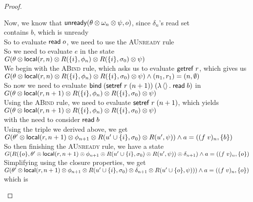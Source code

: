 \begin{proof}
\begin{tabbedproof}
\ooo Now, we know that $\mathsf{unready}({\theta \otimes \omega_n \otimes \psi}, {o})$, since $\delta_n$'s read set \\
\ooo contains $b$, which is unready \\
\ooo So to evaluate $\mathsf{read}\; o$, we need to use the \textsc{AUnready} rule \\
\ooo So we need to evaluate $e$ in the state \\
\ooo $G(\theta \otimes \mathsf{local}({r}, {n}) \otimes R(\{{i}\}, \phi_n) \otimes R(\{{i}\}, \sigma_0) \otimes \psi)$ \\
\ooo We begin with the \textsc{ABind} rule, which asks us to evaluate $\mathsf{getref}\; r$, which gives us \\
\ooo $G(\theta \otimes \mathsf{local}({r}, {n}) \otimes R(\{{i}\}, \phi_n) \otimes R(\{{i}\}, \sigma_0) \otimes \psi) \land (n_1,r_1) = (n,\emptyset)$ \\
\ooo So now we need to evaluate $\mathsf{bind}\; (\mathsf{setref}\; r\;(n+1))\; (\lambda \left<\right>.\;\mathsf{read}\; b)$ in \\
\ooo $G(\theta \otimes \mathsf{local}({r}, {n+1}) \otimes R(\{{i}\}, \phi_n) \otimes R(\{{i}\}, \sigma_0) \otimes \psi)$ \\
\ooo Using the \textsc{ABind} rule, we need to evaluate $\mathsf{setref}\; r\;(n+1)$, which yields  \\
\ooo $G(\theta \otimes \mathsf{local}({r}, {n+1}) \otimes R(\{{i}\}, \phi_n) \otimes R(\{{i}\}, \sigma_0) \otimes \psi)$ \\
\ooo with the need to consider $\mathsf{read}\; b$ \\
\ooo Using the triple we derived above, we get \\
\ooo $G(\theta' \otimes \mathsf{local}({r}, {n+1}) \otimes \phi_{n+1} \otimes R(u' \cup \{{i}\}, \sigma_0) \otimes R(u', \psi))
      \land a = ((f\;v)_n, \{{b}\})$ \\
\ooo So then finishing the \textsc{AUnready} rule, we have a state \\
\ooo $G(R(\{{o}\}, \theta' \otimes \mathsf{local}({r}, {n+1}) \otimes \phi_{n+1} \otimes R(u' \cup \{{i}\}, \sigma_0) \otimes R(u', \psi)) \otimes \delta_{n+1}) \land a = ((f\;v)_n, \{{o}\})$\\
\ooo Simplifying using the closure properties, we get \\
\ooo $G(\theta' \otimes \mathsf{local}({r}, {n+1}) \otimes \phi_{n+1} \otimes R(u' \cup \{{i}\}, \sigma_0) \otimes \delta_{n+1} \otimes R(u' \cup \{{o}\}, \psi))) \land a = ((f\;v)_n, \{{o}\})$\\
\ooo which is \\

\end{tabbedproof}
\end{proof}
